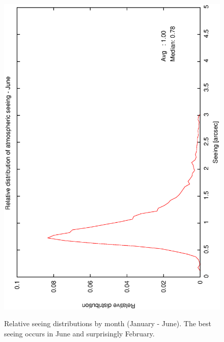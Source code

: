 {{\begin{figure}[htbp]
\begin{center}
{   \includegraphics[scale=0.25, angle=-90]{figures/ecs/corr_see_dist_jun.eps}   
   \label{fig:see_dist_jun}
  }
 \end{center}
  \caption[Relative seeing distributions by month (January - June).]
	  {Relative seeing distributions by month (January - June). The best seeing occurs in June and surprisingly February.}
\label{fig:see_dist_janjun}
\end{figure}

}}
